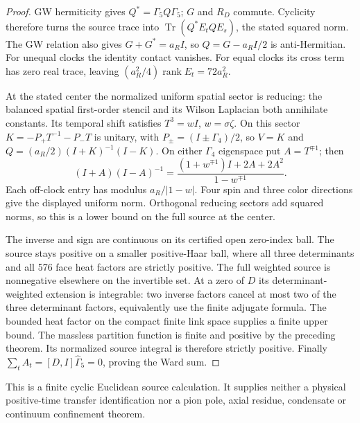 \documentclass[12pt,a4paper]{article}
\begin{document}
\begin{proof}
GW hermiticity gives $Q^*=\Gamma_5Q\Gamma_5$; $G$ and $R_D$ commute.
Cyclicity therefore turns the source trace into
$\operatorname{Tr}(Q^*E_tQE_s)$, the stated squared norm.
The GW relation also gives $G+G^*=a_RI$, so
$Q=G-a_RI/2$ is anti-Hermitian. For unequal clocks the identity contact
vanishes. For equal clocks its cross term has zero real trace, leaving
$(a_R^2/4)\operatorname{rank}E_t=72a_R^2$.

At the stated center the normalized uniform spatial sector is reducing:
the balanced spatial first-order stencil and its Wilson Laplacian both
annihilate constants. Its temporal shift satisfies $T^3=wI$,
$w=\sigma\zeta$. On this sector
$K=-P_+T^{-1}-P_-T$ is unitary, with $P_\pm=(I\pm\Gamma_4)/2$, so
$V=K$ and $Q=(a_R/2)(I+K)^{-1}(I-K)$.
On either $\Gamma_4$ eigenspace put $A=T^{\mp1}$; then
\[
 (I+A)(I-A)^{-1}
   =\frac{(1+w^{\mp1})I+2A+2A^2}{1-w^{\mp1}}.
\]
Each off-clock entry has modulus $a_R/|1-w|$. Four spin and three color
directions give the displayed uniform norm. Orthogonal reducing sectors
add squared norms, so this is a lower bound on the full source at the center.

The inverse and sign are continuous on its certified open zero-index ball.
The source stays positive on a smaller positive-Haar ball, where all three
determinants and all 576 face heat factors are strictly positive.
The full weighted source is nonnegative elsewhere on the invertible set.
At a zero of $D$ its determinant-weighted extension is integrable: two
inverse factors cancel at most two of the three determinant factors,
equivalently use the finite adjugate formula. The bounded heat factor on
the compact finite link space supplies a finite upper bound. The massless
partition function is finite and positive by the preceding theorem.
Its normalized source integral is therefore strictly positive. Finally
$\sum_tA_t=[D,I]\widehat\Gamma_5=0$, proving the Ward sum.
\end{proof}
This is a finite cyclic Euclidean source calculation. It supplies neither
a physical positive-time transfer identification nor a pion pole, axial
residue, condensate or continuum confinement theorem.
\end{document}
